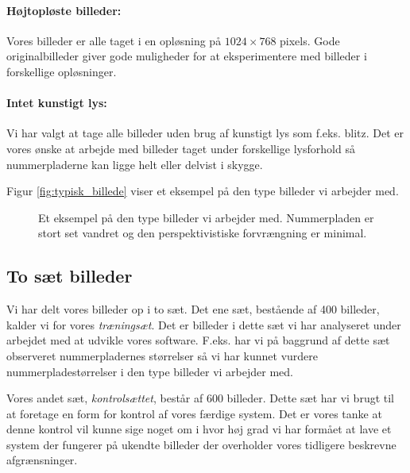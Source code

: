 \paragraph{Højtopløste billeder:}
Vores billeder er alle taget i en opløsning på $1024 \times 768$ pixels. Gode originalbilleder giver gode muligheder for at eksperimentere med billeder i forskellige opløsninger. 

\paragraph{Intet kunstigt lys:}
Vi har valgt at tage alle billeder uden brug af kunstigt lys som f.eks. blitz. Det er vores ønske at arbejde med billeder taget under forskellige lysforhold så nummerpladerne kan ligge helt eller delvist i skygge.  

Figur \vref{fig:typisk_billede} viser et eksempel på den type billeder vi arbejder med.

\begin{figure}[htp]
\centering
{} 
\caption{Et eksempel på den type billeder vi arbejder med. Nummerpladen er stort set vandret og den perspektivistiske forvrængning er minimal.}
\label{fig:typisk_billede}
\end{figure}

\subsection{To sæt billeder}
Vi har delt vores billeder op i to sæt. Det ene sæt, bestående af 400 billeder, kalder vi for vores \textit{træningsæt}. Det er billeder i dette sæt vi har analyseret under arbejdet med at udvikle vores software. F.eks. har vi på baggrund af dette sæt observeret nummerpladernes størrelser så vi har kunnet vurdere nummerpladestørrelser i den type billeder vi arbejder med.

Vores andet sæt, \textit{kontrolsættet}, består af 600 billeder. Dette sæt har vi brugt til at foretage en form for kontrol af vores færdige system. Det er vores tanke at denne kontrol vil kunne sige noget om i hvor høj grad vi har formået at lave et system der fungerer på ukendte billeder der overholder vores  tidligere beskrevne afgrænsninger. 

